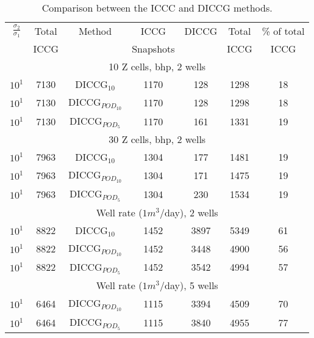 \documentclass[12pt]{article}
\begin{document}
\begin{table}[!ht]\centering
\begin{minipage}{1\textwidth}
 \centering
\begin{tabular}{ ||c|c||c|c|c|c|c||} 
\hline
$\frac{\sigma_2}{\sigma_1}$&Total&Method  & ICCG&DICCG &Total&\% of total\\ 
                           & ICCG     &  & Snapshots& &ICCG& ICCG\\ 
                           \hline
                           \multicolumn{7}{|c|}{10 Z cells, bhp, 2 wells }\\
\hline 
$10^{1}$ &7130& DICCG$_{10}$&1170&128&1298&18\\ 
\hline  
$10^{1}$ &7130& DICCG$_{POD_{10}}$&1170&128&1298&18 \\ 
\hline  
$10^{1}$ &7130& DICCG$_{POD_{5}}$&1170&161&1331&19 \\ 
\hline  
\multicolumn{7}{|c|}{30 Z cells, bhp, 2 wells}\\
\hline 
$10^{1}$ &7963& DICCG$_{10}$&1304&177&1481&19\\ 
\hline  
$10^{1}$ &7963& DICCG$_{POD_{10}}$&1304&171&1475&19 \\ 
\hline  
$10^{1}$ &7963& DICCG$_{POD_{5}}$&1304&230&1534&19 \\ 
\hline  
\multicolumn{7}{|c|}{Well rate ($1m^3$/day), 2 wells}\\
\hline 
$10^{1}$ &8822& DICCG$_{10}$&1452&3897&5349&61\\ 
\hline  
$10^{1}$ &8822& DICCG$_{POD_{10}}$&1452&3448&4900&56 \\ 
\hline  
$10^{1}$ &8822& DICCG$_{POD_{5}}$&1452&3542&4994&57 \\ 
\hline
\multicolumn{7}{|c|}{Well rate ($1m^3$/day), 5 wells}\\
\hline  
$10^{1}$ &6464& DICCG$_{POD_{10}}$&1115&3394&4509&70 \\ 
\hline  
$10^{1}$ &6464& DICCG$_{POD_{5}}$&1115&3840&4955&77 \\ 
\hline  
\hline  
\end{tabular} 
\caption{Comparison between the ICCC and DICCG methods.}\label{table:litertot2} 
\end{minipage}  
\end{table} 
\end{document}
